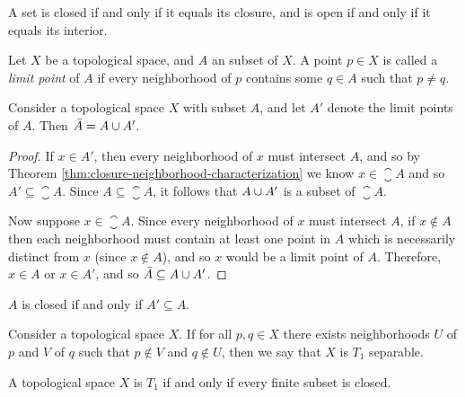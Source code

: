 \begin{lemma}\label{lemma:closure-closed}
    A set is closed if and only if it equals its closure, and is open if and only if it equals its interior.
\end{lemma}

\begin{defn}
    Let $X$ be a topological space, and $A$ an subset of $X$. A point $p \in X$ is called a \emph{limit point} of $A$ if every neighborhood of $p$ contains some $q \in A$ such that $p \neq q$.
\end{defn}

\begin{thm}\label{thm:closure-limit-points}
    Consider a topological space $X$ with subset $A$, and let $A'$ denote the limit points of $A$. Then $\bar{A} = A \cup A'$.
\end{thm}

\begin{proof}
    If $x \in A'$, then every neighborhood of $x$ must intersect $A$, and so by Theorem \ref{thm:closure-neighborhood-characterization} we know $x \in \closure{A}$ and so $A' \subseteq \closure{A}$. Since $A \subseteq \closure{A}$, it follows that $A \cup A'$ is a subset of $\closure{A}$.

    Now suppose $x \in \closure{A}$. Since every neighborhood of $x$ must intersect $A$, if $x \not\in A$ then each neighborhood must contain at least one point in $A$ which is necessarily distinct from $x$ (since $x \not\in A$), and so $x$ would be a limit point of $A$. Therefore, $x \in A$ or $x \in A'$, and so $\bar{A} \subseteq A \cup A'$.
\end{proof}

\begin{cor}\label{cor:closed-iff-self-closure}
    $A$ is closed if and only if $A' \subseteq A$.
\end{cor}

\begin{defn}
    Consider a topological space $X$. If for all $p, q \in X$ there exists neighborhoods $U$ of $p$ and $V$ of $q$ such that $p \not\in V$ and $q \not\in U$, then we say that $X$ is $T_1$ separable.
\end{defn}

\begin{lemma}
    A topological space $X$ is $T_1$ if and only if every finite subset is closed.
\end{lemma}

